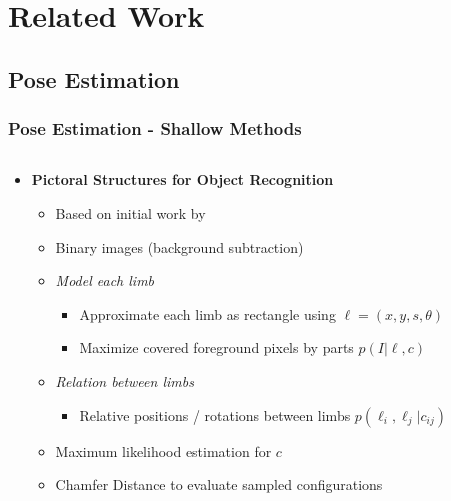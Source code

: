 \documentclass[9pt]{beamer}
\newenvironment{myframe}[1][]{%
\begin{frame}%
\frametitle{#1}
\setcounter{footnote}{0}


}{%
\end{frame}%
}
\begin{document}
\section{Related Work}
\subsection{Pose Estimation}

\begin{myframe}[Pose Estimation - Shallow Methods]
    \begin{columns}[T]
        \begin{column}{.48\textwidth}
            \begin{itemize}
                \item \textbf{Pictoral Structures for Object Recognition \footnotemark}
              \begin{itemize}
                  \item Based on initial work by \footnotemark
                  \item Binary images (background subtraction)
                  \item \textit{Model each limb}
                  \begin{itemize}
                      \item Approximate each limb as rectangle using $\ell = (x,y,s,\theta)$
                      \item Maximize covered foreground pixels by parts $p(I \lvert \ell,c)$
                  \end{itemize}
                  \item \textit{Relation between limbs}
                  \begin{itemize}
                      \item Relative positions / rotations between limbs $p(\ell_i,\ell_j \lvert c_{ij})$
                  \end{itemize}
                  \item Maximum likelihood estimation for $c$
                  \item Chamfer Distance to evaluate sampled configurations
              \end{itemize}
            \end{itemize}
        \end{column}
        \begin{column}{.48\textwidth}

\end{column}
\end{columns}
\end{myframe}
\end{document}
